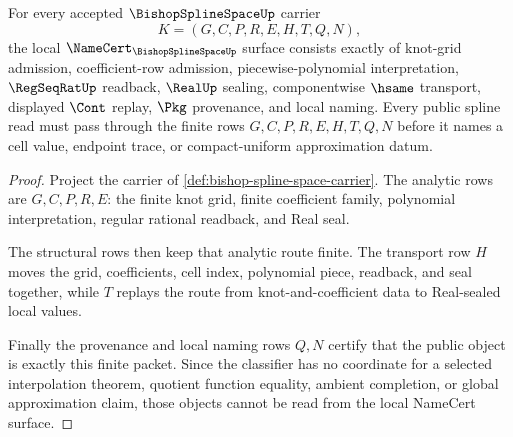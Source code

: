 \begin{theorem}
\label{thm:bishop-spline-space-namecert-obligations}
For every accepted $\BishopSplineSpaceUp$ carrier
$$
K=(G,C,P,R,E,H,T,Q,N),
$$
the local $\NameCert_{\BishopSplineSpaceUp}$ surface consists exactly of knot-grid admission, coefficient-row admission, piecewise-polynomial interpretation, $\RegSeqRatUp$ readback, $\RealUp$ sealing, componentwise $\hsame$ transport, displayed $\Cont$ replay, $\Pkg$ provenance, and local naming. Every public spline read must pass through the finite rows $G,C,P,R,E,H,T,Q,N$ before it names a cell value, endpoint trace, or compact-uniform approximation datum.
\end{theorem}
\begin{proof}
Project the carrier of \autoref{def:bishop-spline-space-carrier}. The analytic rows are $G,C,P,R,E$: the finite knot grid, finite coefficient family, polynomial interpretation, regular rational readback, and Real seal.

The structural rows then keep that analytic route finite. The transport row $H$ moves the grid, coefficients, cell index, polynomial piece, readback, and seal together, while $T$ replays the route from knot-and-coefficient data to Real-sealed local values.

Finally the provenance and local naming rows $Q,N$ certify that the public object is exactly this finite packet. Since the classifier has no coordinate for a selected interpolation theorem, quotient function equality, ambient completion, or global approximation claim, those objects cannot be read from the local NameCert surface.
\end{proof}

